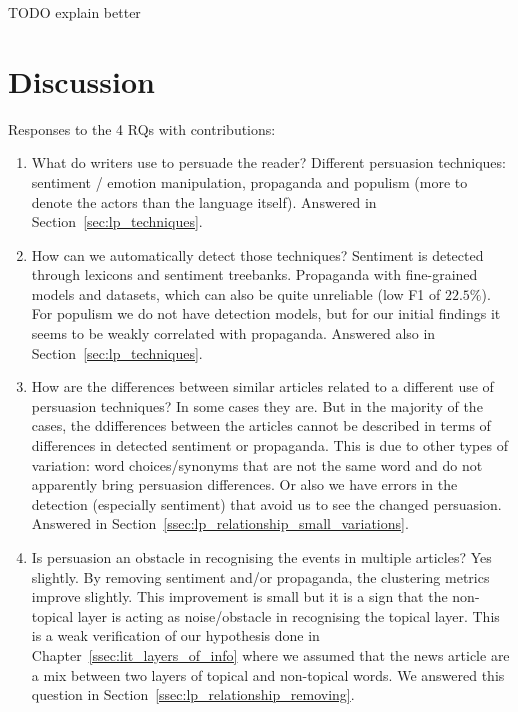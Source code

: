TODO explain better


\section{\statusorange Discussion}

Responses to the 4 RQs with contributions:

\begin{enumerate}
    \item What do writers use to persuade the reader? Different persuasion techniques: sentiment / emotion manipulation, propaganda and populism (more to denote the actors than the language itself). Answered in Section~\ref{sec:lp_techniques}.
    \item How can we automatically detect those techniques? Sentiment is detected through lexicons and sentiment treebanks. Propaganda with fine-grained models and datasets, which can also be quite unreliable (low F1 of $22.5\%$). For populism we do not have detection models, but for our initial findings it seems to be weakly correlated with propaganda. Answered also in Section~\ref{sec:lp_techniques}.
    \item How are the differences between similar articles related to a different use of persuasion techniques? In some cases they are. But in the majority of the cases, the ddifferences between the articles cannot be described in terms of differences in detected sentiment or propaganda. This is due to other types of variation: word choices/synonyms that are not the same word and do not apparently bring persuasion differences. Or also we have errors in the detection (especially sentiment) that avoid us to see the changed persuasion. Answered in Section~\ref{ssec:lp_relationship_small_variations}.
    \item Is persuasion an obstacle in recognising the events in multiple articles? Yes slightly. By removing sentiment and/or propaganda, the clustering metrics improve slightly. This improvement is small but it is a sign that the non-topical layer is acting as noise/obstacle in recognising the topical layer. This is a weak verification of our hypothesis done in Chapter~\ref{ssec:lit_layers_of_info} where we assumed that the news article are a mix between two layers of topical and non-topical words.  We answered this question in Section~\ref{ssec:lp_relationship_removing}.
\end{enumerate}

